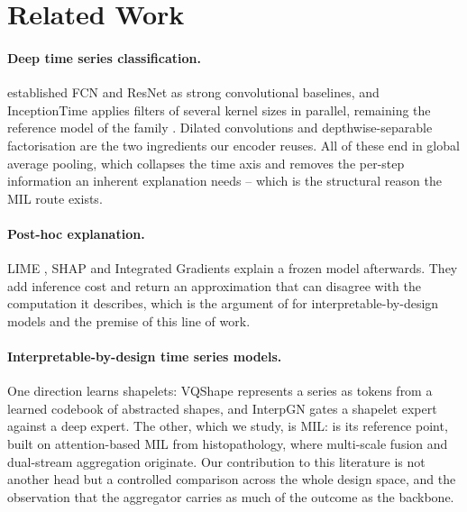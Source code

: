 %

\section{Related Work}
\label{sec:related}

\paragraph{Deep time series classification.}
\citet{wang2017fcn} established FCN and ResNet as strong convolutional baselines, and InceptionTime
\citep{fawaz2020inceptiontime} applies filters of several kernel sizes in parallel, remaining the
reference model of the family \citep{fawaz2019review, dau2019ucr}. Dilated convolutions
\citep{bai2018tcn} and depthwise-separable factorisation \citep{chollet2017xception,
howard2017mobilenets} are the two ingredients our encoder reuses. All of these end in global average
pooling, which collapses the time axis and removes the per-step information an inherent explanation
needs -- which is the structural reason the MIL route exists.

\paragraph{Post-hoc explanation.}
LIME \citep{ribeiro2016lime}, SHAP \citep{lundberg2017shap} and Integrated Gradients
\citep{sundararajan2017ig} explain a frozen model afterwards. They add inference cost and return an
approximation that can disagree with the computation it describes, which is the argument of
\citet{rudin2019stop} for interpretable-by-design models and the premise of this line of work.

\paragraph{Interpretable-by-design time series models.}
One direction learns shapelets: VQShape \citep{wen2024vqshape} represents a series as tokens from a
learned codebook of abstracted shapes, and InterpGN \citep{wen2025interpgn} gates a shapelet expert
against a deep expert. The other, which we study, is MIL: \millet{} \citep{early2024millet} is its
reference point, built on attention-based MIL \citep{ilse2018attention} from histopathology, where
multi-scale fusion \citep{hashimoto2020msdamil} and dual-stream aggregation \citep{li2021dsmil}
originate. Our contribution to this literature is not another head but a controlled comparison
across the whole design space, and the observation that the aggregator carries as much of the
outcome as the backbone.

